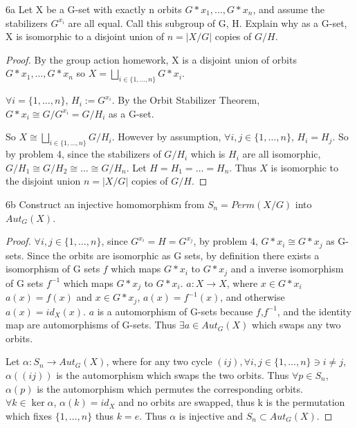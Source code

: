 \documentclass{article}
\begin{document}
\bigskip

\begin{PROB}{6a}\label{Problem 6a.}
    Let X be a G-set with exactly n orbits $G \ast x_1,\ldots, G \ast x_n$, and assume the stabilizers $G^{x_i}$ are all equal. Call this subgroup of G, H. Explain why as a G-set, X is isomorphic to a disjoint union of $n = |X/G|$ copies of $G/H$.
\end{PROB}
\begin{proof}
    By the group action homework, X is a disjoint union of orbits $G \ast x_1, \ldots, G \ast x_n$ so $X = \bigsqcup_{i \in \{1, \ldots, n\}}G \ast x_i$. 
    
    $\forall i = \{1, \ldots, n\}$, $H_i := G^{x_i}$. By the Orbit Stabilizer Theorem, $G \ast x_i \cong G/G^{x_i} = G/H_i$ as a G-set.
    
    So $X \cong \bigsqcup_{i \in \{1, \ldots, n\}}G/H_i$. However by assumption, $\forall i, j \in \{1, \ldots, n\}$, $H_i = H_j$. So by problem 4, since the stabilizers of $G/H_i$ which is $H_i$ are all isomorphic, $G/H_1 \cong G/H_2 \cong \ldots \cong G/H_n$. Let $H = H_1 = \ldots = H_n$. Thus $X$ is isomorphic to the disjoint union $n = |X/G|$ copies of $G/H$.
\end{proof}
\begin{PROB}{6b}\label{Problem 6b.}
    Construct an injective homomorphism from $S_n =Perm(X/G)$ into $Aut_G(X)$.
\end{PROB}
\begin{proof}
    $\forall i, j \in \{1, \ldots, n\}$, since $G^{x_i} = H = G^{x_j}$, by problem 4, $G \ast x_i \cong G \ast x_j$ as G-sets. Since the orbits are isomorphic as G sets, by definition there exists a isomorphism of G sets $f$ which maps $G \ast x_i$ to $G \ast x_j$ and a inverse isomorphism of G sets $f^{-1}$ which maps $G \ast x_j$ to $G \ast x_i$. $a: X \to X$, where $x \in G \ast x_i$ $a(x) = f(x)$ and $x \in G \ast x_j$, $a(x) = f^{-1}(x)$, and otherwise $a(x) = id_X(x)$. $a$ is a automorphism of G-sets because $f$,$f^{-1}$, and the identity map are automorphisms of G-sets. Thus $\exists a \in Aut_G(X)$ which swaps any two orbits.
    
    Let $\alpha: S_n \to Aut_G(X)$, where for any two cycle $(i j), \forall i, j \in \{1, \ldots, n\} \ni i \neq j$, $\alpha((i j))$ is the automorphism which swaps the two orbits. Thus $\forall p \in S_n$, $\alpha(p)$ is the automorphism which permutes the corresponding orbits. $\forall k \in \ker \alpha$, $\alpha(k) = id_X$ and no orbits are swapped, thus k is the permutation which fixes $\{1, \ldots, n\}$ thus $k = e$. Thus $\alpha$ is injective and $S_n \subset Aut_G(X)$.
\end{proof}
\end{document}
